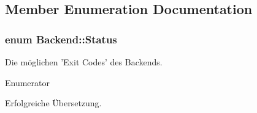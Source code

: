 \subsection{Member Enumeration Documentation}
\hypertarget{classBackend_a0e8eebed86bd15218f21b068f6c229f2}{
\subsubsection[{Status}]{\setlength{\rightskip}{0pt plus 5cm}enum {\bf Backend\-::\-Status}}}\label{classBackend_a0e8eebed86bd15218f21b068f6c229f2}
Die möglichen 'Exit Codes' des Backends. \begin{Desc}
\item[Enumerator]\par
\begin{description}
\item[{\em 
\hypertarget{classBackend_a0e8eebed86bd15218f21b068f6c229f2a85c3bbdd79e0c08753992d41f8a7d25c}{S\-U\-C\-C\-E\-S\-S}\label{classBackend_a0e8eebed86bd15218f21b068f6c229f2a85c3bbdd79e0c08753992d41f8a7d25c}
}]Erfolgreiche Übersetzung. \end{description}
\end{Desc}


